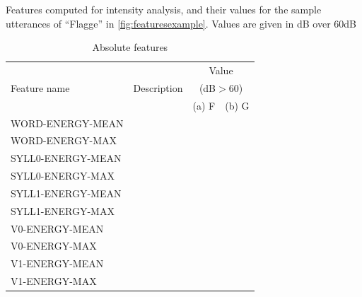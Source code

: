 	
\begin{table}[h!]
		\centering
		\caption[Features computed for intensity  analysis]{Features computed for intensity analysis, and their values for the sample utterances of ``Flagge'' in \cref{fig:featuresexample}. Values are given in dB over 60dB}	
		
		
		\begin{subtable}[h]{\textwidth}
		\caption{Absolute features}
		\begin{tabularx}{\textwidth}{p{}Xrr}
		\toprule
		\multirow{3}{*}{Feature name} 
							& \multirow{3}{*}{Description}
									& \multicolumn{2}{c}{Value} \\
							&		& \multicolumn{2}{c}{(dB$>$60)} \\							
					  		&		&  (a) F		& (b) G\\
		\midrule
		
	
WORD-ENERGY-MEAN & \color{red}{TD} &  \color{red}{TD}	& \color{red}{TD}\\
WORD-ENERGY-MAX & \color{red}{TD} &  \color{red}{TD}	& \color{red}{TD}\\
SYLL0-ENERGY-MEAN & \color{red}{TD} &  \color{red}{TD}	& \color{red}{TD}\\
SYLL0-ENERGY-MAX & \color{red}{TD} &  \color{red}{TD}	& \color{red}{TD}\\
SYLL1-ENERGY-MEAN & \color{red}{TD} &  \color{red}{TD}	& \color{red}{TD}\\
SYLL1-ENERGY-MAX & \color{red}{TD} &  \color{red}{TD}	& \color{red}{TD}\\
V0-ENERGY-MEAN & \color{red}{TD} &  \color{red}{TD}	& \color{red}{TD}\\
V0-ENERGY-MAX & \color{red}{TD} &  \color{red}{TD}	& \color{red}{TD}\\
V1-ENERGY-MEAN & \color{red}{TD} &  \color{red}{TD}	& \color{red}{TD}\\
V1-ENERGY-MAX & \color{red}{TD} &  \color{red}{TD}	& \color{red}{TD}\\
	
	\bottomrule
	\end{tabularx}
	\end{subtable}
	\vspace{2em}	
	
%
		

\end{table}
